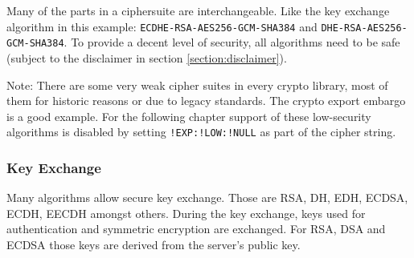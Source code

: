 


Many of the parts in a ciphersuite are interchangeable. Like the key exchange
algorithm in this example: \texttt{ECDHE-RSA-AES256-GCM-SHA384} and
\texttt{DHE-RSA-AES256-GCM-SHA384}.  To provide a decent level of security, all
algorithms need to be safe (subject to the disclaimer in section
\ref{section:disclaimer}).

Note: There are some very weak cipher suites in every crypto library, most of
them for historic reasons or due to legacy standards. The crypto export embargo
is a good example\cite{Wikipedia:ExportCipher}.  For the following chapter
support of these low-security algorithms is disabled by setting
\texttt{!EXP:!LOW:!NULL} as part of the cipher string.


\subsubsection{Key Exchange}

Many algorithms allow secure key exchange.  Those are RSA, DH, EDH, ECDSA,
ECDH, EECDH amongst others. During the key exchange, keys used for authentication
and symmetric encryption are exchanged. For RSA, DSA and ECDSA those keys are derived
from the server's public key.


